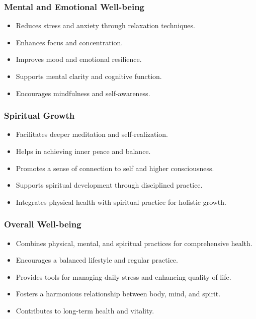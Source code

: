 \begin{frame}[fragile]\frametitle{Mental and Emotional Well-being}

      \begin{itemize}
		\item Reduces stress and anxiety through relaxation techniques.
		\item Enhances focus and concentration.
		\item Improves mood and emotional resilience.
		\item Supports mental clarity and cognitive function.
		\item Encourages mindfulness and self-awareness.
	  \end{itemize}

\end{frame}

\begin{frame}[fragile]\frametitle{Spiritual Growth}

      \begin{itemize}
		\item Facilitates deeper meditation and self-realization.
		\item Helps in achieving inner peace and balance.
		\item Promotes a sense of connection to self and higher consciousness.
		\item Supports spiritual development through disciplined practice.
		\item Integrates physical health with spiritual practice for holistic growth.
	  \end{itemize}

\end{frame}

\begin{frame}[fragile]\frametitle{Overall Well-being}

      \begin{itemize}
		\item Combines physical, mental, and spiritual practices for comprehensive health.
		\item Encourages a balanced lifestyle and regular practice.
		\item Provides tools for managing daily stress and enhancing quality of life.
		\item Fosters a harmonious relationship between body, mind, and spirit.
		\item Contributes to long-term health and vitality.
	  \end{itemize}

\end{frame}

